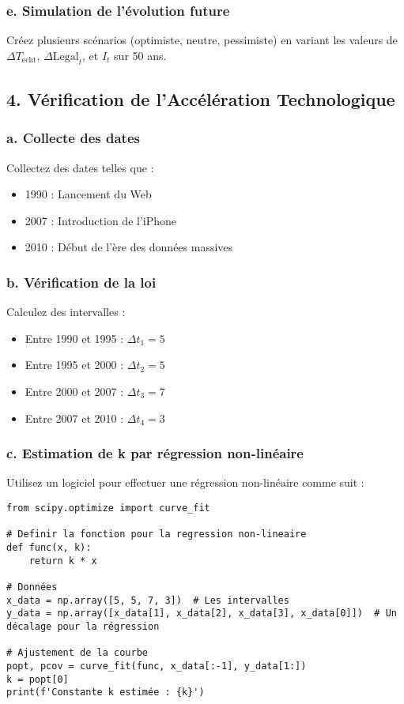 \documentclass{article}
\begin{document}
\subsubsection{e. Simulation de l'évolution future}
Créez plusieurs scénarios (optimiste, neutre, pessimiste) en variant les valeurs de \( \Delta T_{\text{echt}} \), \( \Delta \text{Legal}_t \), et \( I_t \) sur 50 ans.

\subsection{4. Vérification de l'Accélération Technologique}

\subsubsection{a. Collecte des dates}
Collectez des dates telles que :
\begin{itemize}
    \item 1990 : Lancement du Web
    \item 2007 : Introduction de l'iPhone
    \item 2010 : Début de l'ère des données massives
\end{itemize}

\subsubsection{b. Vérification de la loi}
Calculez des intervalles :
\begin{itemize}
    \item Entre 1990 et 1995 : \( \Delta t_1 = 5 \)
    \item Entre 1995 et 2000 : \( \Delta t_2 = 5 \)
    \item Entre 2000 et 2007 : \( \Delta t_3 = 7 \)
    \item Entre 2007 et 2010 : \( \Delta t_4 = 3 \)
\end{itemize}

\subsubsection{c. Estimation de k par régression non-linéaire}
Utilisez un logiciel pour effectuer une régression non-linéaire comme suit :
\begin{verbatim}
from scipy.optimize import curve_fit

# Definir la fonction pour la regression non-lineaire
def func(x, k):
    return k * x

# Données
x_data = np.array([5, 5, 7, 3])  # Les intervalles
y_data = np.array([x_data[1], x_data[2], x_data[3], x_data[0]])  # Un décalage pour la régression

# Ajustement de la courbe
popt, pcov = curve_fit(func, x_data[:-1], y_data[1:])
k = popt[0]
print(f'Constante k estimée : {k}')
\end{verbatim}
\end{document}
